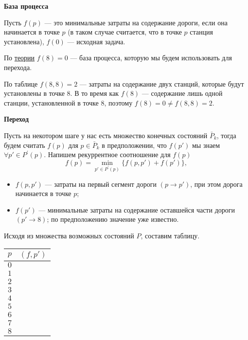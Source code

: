 \bigskip

\textbf{База процесса}

Пусть $f(p)$ --- это минимальные затраты на содержание дороги, если она начинается в точке $p$ (в таком случае считается, что в точке $p$ станция установлена), $f(0)$ --- исходная задача.

По \hyperref[alg:unknown_step_process]{теории} $f(8) = 0$ --- база процесса, которую мы будем использовать для перехода.

\begin{note}
	По таблице $f(8, 8) = 2$ --- затраты на содержание двух станций, которые будут установлены в точке $8$. В то время как $f(8)$ --- содержание лишь одной станции, установленной в точке $8$, поэтому $f(8) = 0 \neq f(8, 8) = 2$.
\end{note}

\bigskip

\textbf{Переход}

Пусть на некотором шаге у нас есть множество конечных состояний $\bar{P}_k$, тогда будем считать $f(p)$ для $p \in \bar{P}_k$ в предположении, что $f(p')$ мы знаем $\forall p' \in P^{'}(p)$. Напишем рекуррентное соотношение для $f(p)$
\[
\boxed{f(p) = \min_{p' \in P^{'}(p)} \Big\{f(p, p') + f(p') \Big\}},\tag{*}
\]

\begin{itemize}[nosep]
	\item $f(p, p')$ --- затраты на первый сегмент дороги $(p \to p')$, при этом дорога начинается в точке $p$;
	
	\item $f(p')$ --- минимальные затраты на содержание оставшейся части дороги $(p' \to 8)$; по предположению значение уже известно.
\end{itemize}

Исходя из множества возможных состояний $P$, составим таблицу.

\begin{table}[H]
	\centering
	\begin{tabular}{ | c | c | } 
		\hline
		$p$ & $(f, p')$ \\ 
		\hline
		$0$ & \\\hline
		$1$ & \\\hline
		$2$ & \\\hline
		$3$ & \\\hline
		$4$ & \\\hline
		$5$ & \\\hline
		$6$ & \\\hline
		$7$ & \\\hline
		$8$ & \\\hline
	\end{tabular}
\end{table}


